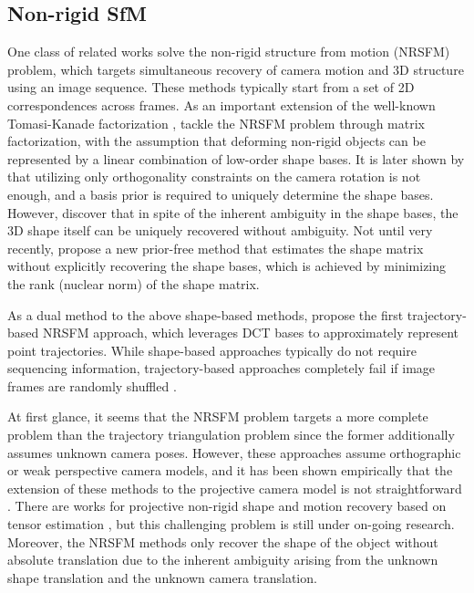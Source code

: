 \subsection{Non-rigid SfM}
One class of related works solve the non-rigid structure from motion (NRSFM) problem, which targets simultaneous recovery of camera motion and 3D structure using an image sequence. These methods typically start from a set of 2D correspondences across frames. 
As an important extension of the well-known Tomasi-Kanade factorization \cite{tomasi1992shape}, 
\citet{Bregler_CVPR2000} tackle the NRSFM problem through matrix factorization, with the assumption that deforming non-rigid objects can be represented by a linear combination of low-order shape bases. 
It is later shown by \citet{Xiao_ECCV2004} that utilizing only orthogonality constraints on the camera rotation is not enough, and a basis prior is required to uniquely determine the shape bases.
However, \citet{akhter2009defense} discover that in spite of the inherent ambiguity in the shape bases, the 3D shape itself can be uniquely recovered without ambiguity.
Not until very recently, \cite{dai2014simple} propose a new prior-free method that estimates the shape matrix without explicitly recovering the shape bases, which is achieved by minimizing the rank (nuclear norm) of the shape matrix.

As a dual method to the above shape-based methods, \citet{Akhter_NIPS08} propose the first trajectory-based NRSFM approach, which leverages DCT bases to approximately represent point trajectories.
While shape-based approaches typically do not require sequencing information, trajectory-based approaches completely fail if image frames are randomly shuffled \cite{dai2014simple}.

At first glance, it seems that the NRSFM problem targets a more complete problem than the trajectory triangulation problem since the former additionally assumes unknown camera poses.
However, these approaches assume orthographic or weak perspective camera models, and it has been shown empirically that the extension of these methods to the projective camera model is not straightforward \cite{Park_ECCV2010}. There are works for projective non-rigid shape and motion recovery based on tensor estimation \cite{hartley2008perspective,vidal2006nonrigid}, but this challenging problem is still under on-going research. Moreover, the NRSFM methods only recover the shape of the object without absolute translation due to the inherent ambiguity arising from the unknown shape translation and the unknown camera translation. 

